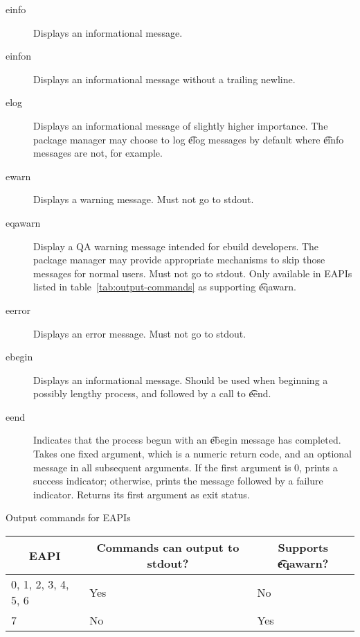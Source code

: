 \begin{description}
\item[einfo] Displays an informational message.
\item[einfon] Displays an informational message without a trailing newline.
\item[elog] Displays an informational message of slightly higher importance. The package
    manager may choose to log \t{elog} messages by default where \t{einfo} messages are not, for
    example.
\item[ewarn] Displays a warning message. Must not go to stdout.
\item[eqawarn]  Display a QA warning message intended for ebuild developers.
    The package manager may provide appropriate mechanisms to skip those messages for normal users.
    Must not go to stdout. Only available in EAPIs listed in table~\ref{tab:output-commands} as
    supporting \t{eqawarn}.
\item[eerror] Displays an error message. Must not go to stdout.
\item[ebegin] Displays an informational message. Should be used when beginning a possibly
    lengthy process, and followed by a call to \t{eend}.
\item[eend] Indicates that the process begun with an \t{ebegin} message has completed. Takes one
    fixed argument, which is a numeric return code, and an optional message in all subsequent
    arguments. If the first argument is 0, prints a success indicator; otherwise, prints the
    message followed by a failure indicator. Returns its first argument as exit status.
\end{description}

\begin{centertable}{Output commands for EAPIs}
    \label{tab:output-commands}
    \begin{tabular}{lll}
      \toprule
      \multicolumn{1}{c}{\textbf{EAPI}} &
      \multicolumn{1}{c}{\textbf{Commands can output to stdout?}} &
      \multicolumn{1}{c}{\textbf{Supports \t{eqawarn}?}} \\
      \midrule
      0, 1, 2, 3, 4, 5, 6 & Yes & No  \\
      7                   & No  & Yes \\
      \bottomrule
    \end{tabular}
\end{centertable}

